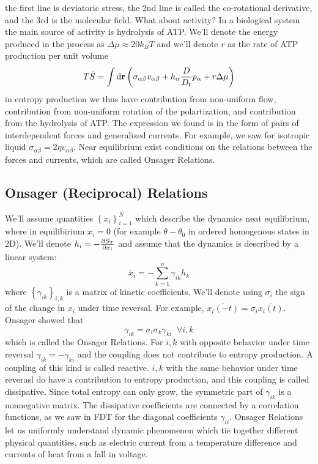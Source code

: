the first line is deviatoric stress, the 2nd line is called the co-rotational derivative, and the 3rd is the molecular field. What about activity? In a biological system the main source of activity is hydrolysis of ATP. We'll denote the energy produced in the process as \(\Delta\mu \approx 20 k_BT\) and we'll denote \(r\) as the rate of ATP production per unit volume
\begin{equation}
    T\dot{S} = \int \mathop{}\!\mathrm{d}\mathbf{r} \left(\sigma_{\alpha\beta} v_{\alpha\beta} +h_\alpha \frac{D}{D_t}p_\alpha + r\Delta\mu\right)
\end{equation}
in entropy production we thus have contribution from non-uniform flow, contribution from non-uniform rotation of the polartization, and contribution from the hydrolysis of ATP. The expression we found is in the form of pairs of interdependent forces and generalized currents. For example, we saw for isotropic liquid \(\sigma_{\alpha\beta} = 2\eta v_{\alpha\beta}\). Near equilibrium exist conditions on the relations between the forces and currents, which are called Onsager Relations.
\subsection{Onsager (Reciprocal) Relations}
We'll assume quantities \(\left\{x_i\right\}_{i=1}^N\) which describe the dynamics neat equilibrium, where in equilibirium \(x_i=0\) (for example \(\theta-\theta_0\) in ordered homogenous states in 2D). We'll denote \(h_i = -\diffp{S_T}{x_i}\) and assume that the dynamics is described by a linear system:
\begin{equation}
    \dot{x_i} = -\sum\limits_{k=1}^n \gamma_{ik}h_k
\end{equation}
where \(\left\{\gamma_{ik}\right\}_{i,k}\) is a matrix of kinetic coefficients. We'll denote using \(\sigma_i\) the sign of the change in \(x_i\) under time reversal. For example, \(\overline{x_i(-t)} = \sigma_i \overline{x_i(t)}\). Onsager showed that
\begin{equation}
    \gamma_{ik} = \sigma_i \sigma_k \gamma_{ki} \;\; \forall i,k
\end{equation}
which is called the Onsager Relations. For \(i,k\) with opposite behavior under time reversal \(\gamma_{ik} = -\gamma_{ki}\) and the coupling does not contribute to entropy production. A coupling of this kind is called reactive. \(i,k\) with the same behavior under time reverasl do have a contribution to entropy production, and this coupling is called dissipative. Since total entropy can only grow, the symmetric part of \(\gamma_{ik}\) is a nonnegative matrix. The dissipative coefficients are connected by a correlation functions, as we saw in FDT for the diagonal coefficients \(\gamma_{ii}\). Onsager Relations let us uniformly understand dynamic phenomenon which tie together different physical quantities, such as electric current from a temperature difference and currents of heat from a fall in voltage.
